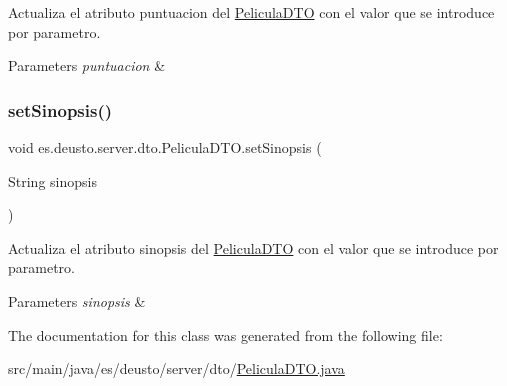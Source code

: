 Actualiza el atributo puntuacion del \mbox{\hyperlink{classes_1_1deusto_1_1server_1_1dto_1_1_pelicula_d_t_o}{Pelicula\+D\+TO}} con el valor que se introduce por parametro. 
\begin{DoxyParams}{Parameters}
{\em puntuacion} & \\
\hline
\end{DoxyParams}
\mbox{\label{classes_1_1deusto_1_1server_1_1dto_1_1_pelicula_d_t_o_a794472de752d1121df491d74305ebb78}} 
\subsubsection{\texorpdfstring{setSinopsis()}{setSinopsis()}}
{\footnotesize\ttfamily void es.\+deusto.\+server.\+dto.\+Pelicula\+D\+T\+O.\+set\+Sinopsis (\begin{DoxyParamCaption}\item[{String}]{sinopsis }\end{DoxyParamCaption})}

Actualiza el atributo sinopsis del \mbox{\hyperlink{classes_1_1deusto_1_1server_1_1dto_1_1_pelicula_d_t_o}{Pelicula\+D\+TO}} con el valor que se introduce por parametro. 
\begin{DoxyParams}{Parameters}
{\em sinopsis} & \\
\hline
\end{DoxyParams}


The documentation for this class was generated from the following file\+:\begin{DoxyCompactItemize}
\item 
src/main/java/es/deusto/server/dto/\mbox{\hyperlink{_pelicula_d_t_o_8java}{Pelicula\+D\+T\+O.\+java}}\end{DoxyCompactItemize}
